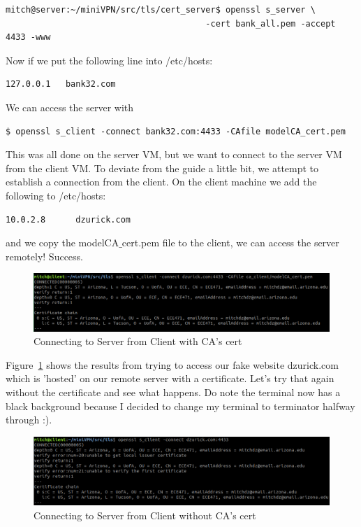 \documentclass[12pt]{article}
\newcommand\tab[1][0.5cm]{\hspace*{#1}}
\begin{document}
\begin{verbatim}
mitch@server:~/miniVPN/src/tls/cert_server$ openssl s_server \
                                        -cert bank_all.pem -accept 4433 -www
\end{verbatim}

Now if we put the following line into /etc/hosts:
\begin{verbatim}
127.0.0.1	bank32.com
\end{verbatim}
We can access the server with 
\begin{verbatim}
$ openssl s_client -connect bank32.com:4433 -CAfile modelCA_cert.pem
\end{verbatim}
\tab This was all done on the server VM, but we want to connect to the server VM from the client VM. To deviate from the guide a little bit, we attempt to establish a connection from the client. On the client machine we add the following to /etc/hosts:
\begin{verbatim}
10.0.2.8      dzurick.com
\end{verbatim}

and we copy the modelCA$\_$cert.pem file to the client, we can access the server remotely! Success.
    \begin{figure}[H]
        \begin{center}
            \includegraphics[scale=0.6]{t4_2.png}
        \end{center}{}
        \caption{Connecting to Server from Client with CA's cert}
        \label{fig:t4_2}
    \end{figure}

\tab Figure~\ref{fig:t4_2} shows the results from trying to access our fake website dzurick.com which is 'hosted' on our remote server with a certificate. Let's try that again without the certificate and see what happens. Do note the terminal now has a black background because I decided to change my terminal to terminator halfway through :).

    \begin{figure}[H]
        \begin{center}
            \includegraphics[scale=0.6]{t4_3.png}
        \end{center}{}
        \caption{Connecting to Server from Client without CA's cert}
        \label{fig:t4_3}
    \end{figure}
    
\end{document}
